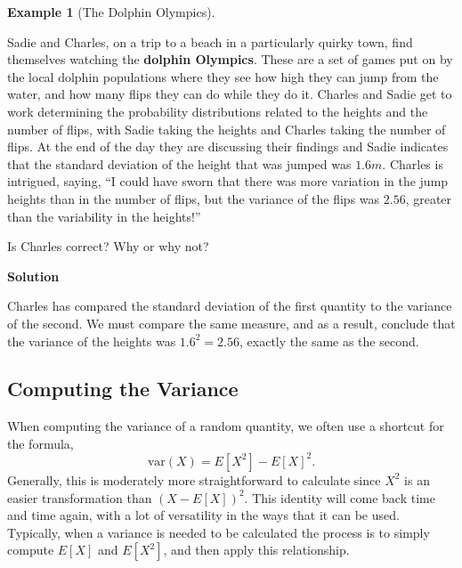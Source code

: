 \documentclass[
  letterpaper,
  DIV=11,
  numbers=noendperiod]{scrreprt}
\theoremstyle{definition}
\theoremstyle{definition}
\newtheorem{example}{Example}[chapter]
\theoremstyle{definition}
\theoremstyle{remark}
\begin{document}
\begin{example}[The Dolphin
Olympics]\protect\hypertarget{exm-dolphin-olympics}{}\label{exm-dolphin-olympics}

Sadie and Charles, on a trip to a beach in a particularly quirky town,
find themselves watching the \textbf{dolphin Olympics}. These are a set
of games put on by the local dolphin populations where they see how high
they can jump from the water, and how many flips they can do while they
do it. Charles and Sadie get to work determining the probability
distributions related to the heights and the number of flips, with Sadie
taking the heights and Charles taking the number of flips. At the end of
the day they are discussing their findings and Sadie indicates that the
standard deviation of the height that was jumped was \(1.6m\). Charles
is intrigued, saying, ``I could have sworn that there was more variation
in the jump heights than in the number of flips, but the variance of the
flips was \(2.56\), greater than the variability in the heights!''

Is Charles correct? Why or why not?

\begin{tcolorbox}[enhanced jigsaw, colback=white, colframe=quarto-callout-color-frame, arc=.35mm, leftrule=.75mm, rightrule=.15mm, opacityback=0, breakable, bottomrule=.15mm, left=2mm, toprule=.15mm]

\vspace{-3mm}\textbf{Solution}\vspace{3mm}

Charles has compared the standard deviation of the first quantity to the
variance of the second. We must compare the same measure, and as a
result, conclude that the variance of the heights was \(1.6^2 = 2.56\),
exactly the same as the second.

\end{tcolorbox}

\end{example}

\subsection{Computing the Variance}\label{computing-the-variance}

When computing the variance of a random quantity, we often use a
shortcut for the formula, \[\text{var}(X) = E[X^2] - E[X]^2.\]
Generally, this is moderately more straightforward to calculate since
\(X^2\) is an easier transformation than \((X-E[X])^2\). This identity
will come back time and time again, with a lot of versatility in the
ways that it can be used. Typically, when a variance is needed to be
calculated the process is to simply compute \(E[X]\) and \(E[X^2]\), and
then apply this relationship.
\end{document}
